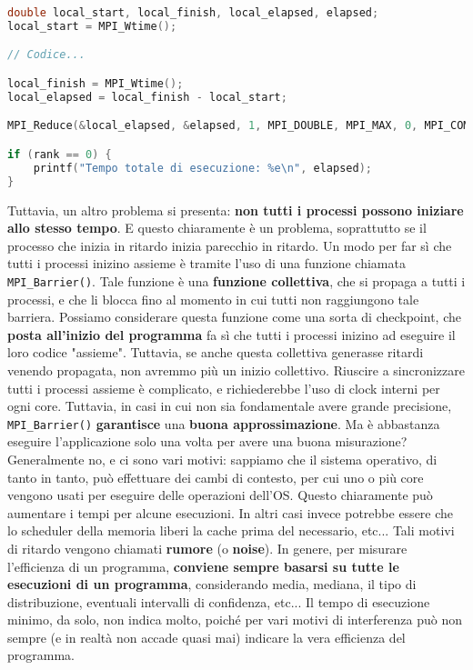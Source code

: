 \begin{codeblock}
    \begin{lstlisting}[language = C]
double local_start, local_finish, local_elapsed, elapsed;
local_start = MPI_Wtime();

// Codice...

local_finish = MPI_Wtime();
local_elapsed = local_finish - local_start;

MPI_Reduce(&local_elapsed, &elapsed, 1, MPI_DOUBLE, MPI_MAX, 0, MPI_COMM_WORLD);

if (rank == 0) {
    printf("Tempo totale di esecuzione: %e\n", elapsed);
}\end{lstlisting}
\end{codeblock}

Tuttavia, un altro problema si presenta: \textbf{non tutti i processi possono iniziare allo stesso tempo}. E questo chiaramente è un problema, soprattutto se il processo che inizia in ritardo inizia parecchio in ritardo. Un modo per far sì che tutti i processi inizino assieme è tramite l'uso di una funzione chiamata \verb|MPI_Barrier()|. Tale funzione è una \textbf{funzione collettiva}, che si propaga a tutti i processi, e che li blocca fino al momento in cui tutti non raggiungono tale barriera. Possiamo considerare questa funzione come una sorta di checkpoint, che \textbf{posta all'inizio del programma} fa sì che tutti i processi inizino ad eseguire il loro codice "assieme".
\nwl
Tuttavia, se anche questa collettiva generasse ritardi venendo propagata, non avremmo più un inizio collettivo. Riuscire a sincronizzare tutti i processi assieme è complicato, e richiederebbe l'uso di clock interni per ogni core. Tuttavia, in casi in cui non sia fondamentale avere grande precisione, \verb|MPI_Barrier()| \textbf{garantisce} una \textbf{buona approssimazione}.
\nwl
Ma è abbastanza eseguire l'applicazione solo una volta per avere una buona misurazione? Generalmente no, e ci sono vari motivi: sappiamo che il sistema operativo, di tanto in tanto, può effettuare dei cambi di contesto, per cui uno o più core vengono usati per eseguire delle operazioni dell'OS. Questo chiaramente può aumentare i tempi per alcune esecuzioni. In altri casi invece potrebbe essere che lo scheduler della memoria liberi la cache prima del necessario, etc...
\nwl
Tali motivi di ritardo vengono chiamati \textbf{rumore} (o \textbf{noise}). In genere, per misurare l'efficienza di un programma, \textbf{conviene sempre basarsi su tutte le esecuzioni di un programma}, considerando media, mediana, il tipo di distribuzione, eventuali intervalli di confidenza, etc... Il tempo di esecuzione minimo, da solo, non indica molto, poiché per vari motivi di interferenza può non sempre (e in realtà non accade quasi mai) indicare la vera efficienza del programma.

